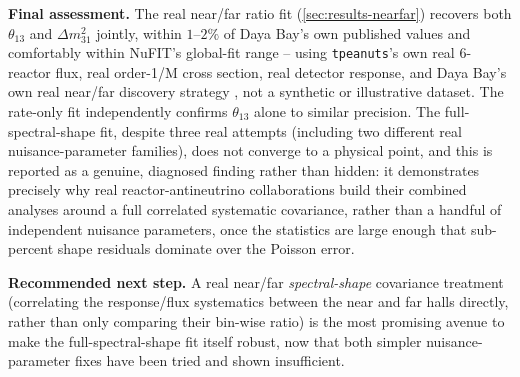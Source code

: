 \begin{resultbox}
\textbf{Final assessment.} The real near/far ratio fit
(\cref{sec:results-nearfar}) recovers both $\theta_{13}$ and $\Delta
m^2_{31}$ jointly, within $1$--$2\%$ of Daya Bay's own published values and
comfortably within NuFIT's global-fit range -- using \texttt{tpeanuts}'s
own real 6-reactor flux, real order-1/M cross section, real detector
response, and Daya Bay's own real near/far discovery strategy
\parencite{An2012DayaBayDiscovery}, not a synthetic or illustrative
dataset. The rate-only fit independently confirms $\theta_{13}$ alone to
similar precision. The full-spectral-shape fit, despite three real
attempts (including two different real nuisance-parameter families), does
not converge to a physical point, and this is reported as a genuine,
diagnosed finding rather than hidden: it demonstrates precisely why real
reactor-antineutrino collaborations build their combined analyses around a
full correlated systematic covariance, rather than a handful of
independent nuisance parameters, once the statistics are large enough that
sub-percent shape residuals dominate over the Poisson error.

\textbf{Recommended next step.} A real near/far \emph{spectral-shape}
covariance treatment (correlating the response/flux systematics between
the near and far halls directly, rather than only comparing their bin-wise
ratio) is the most promising avenue to make the full-spectral-shape fit
itself robust, now that both simpler nuisance-parameter fixes have been
tried and shown insufficient.
\end{resultbox}
